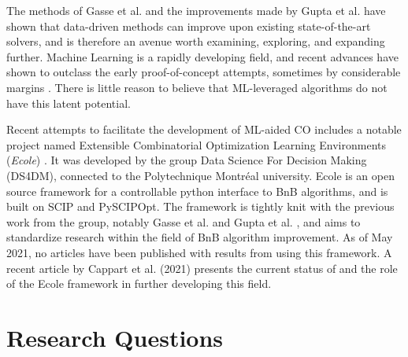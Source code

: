 The methods of Gasse et al. \cite{gasse2019exact} and the improvements made by Gupta et al. \cite{gupta2020hybrid} have shown that data-driven methods can improve upon existing state-of-the-art solvers, and is therefore an avenue worth examining, exploring, and expanding further. Machine Learning is a rapidly developing field, and recent advances have shown to outclass the early proof-of-concept attempts, sometimes by considerable margins \cite{holzinger2018current}. There is little reason to believe that ML-leveraged algorithms do not have this latent potential. 

Recent attempts to facilitate the development of \gls{ML}-aided \gls{CO} includes a notable project named Extensible Combinatorial Optimization Learning Environments (\emph{Ecole}) \cite{prouvost2020ecole}. It was developed by the group Data Science For Decision Making (\gls{DS4DM}), connected to the Polytechnique Montr\'{e}al university. \gls{Ecole} is an open source framework for a controllable python interface to \gls{BnB} algorithms, and is built on SCIP and PySCIPOpt. The framework is tightly knit with the previous work from the group, notably Gasse et al. \cite{gasse2019exact} and Gupta et al. \cite{gupta2020hybrid}, and aims to standardize research within the field of \gls{BnB} algorithm improvement.  
As of May 2021, no articles have been published with results from using this framework. A recent article by
Cappart et al. (2021) \cite{cappart2021combinatorial} presents the current status of and the role of the \gls{Ecole} framework in further developing this field. 


\section{Research Questions}\label{sec:questions}

